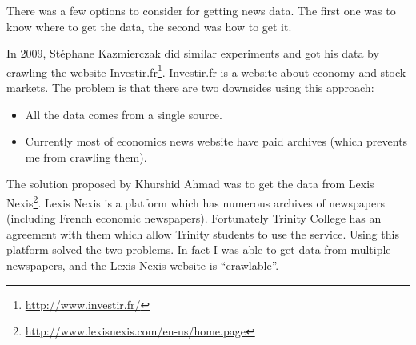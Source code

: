 \documentclass[12pt]{report}
\begin{document}
There was a few options to consider for getting news data. The first one was to know where to get the data, the second was how to get it.

In 2009, Stéphane Kazmierczak \cite{kazmierczak08} did similar experiments and got his data by crawling the website Investir.fr\footnote{\url{http://www.investir.fr/}}. Investir.fr is a website about economy and stock markets. The problem is that there are two downsides using this approach:
\begin{itemize}
	\item All the data comes from a single source.
	\item Currently most of economics news website have paid archives (which prevents me from crawling them).
\end{itemize}

The solution proposed by Khurshid Ahmad was to get the data from Lexis Nexis\footnote{\url{http://www.lexisnexis.com/en-us/home.page}}. Lexis Nexis is a platform which has numerous archives of newspapers (including French economic newspapers). Fortunately Trinity College has an agreement with them which allow Trinity students to use the service. Using this platform solved the two problems. In fact I was able to get data from multiple newspapers, and the Lexis Nexis website is ``crawlable''.
\end{document}
